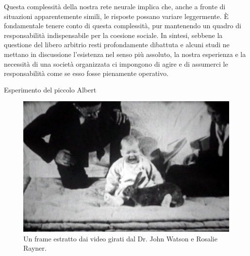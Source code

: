 \documentclass[12pt]{book} %
\begin{document}
Questa complessità della nostra rete neurale implica che, anche a fronte di situazioni apparentemente simili, le risposte possano variare leggermente. È fondamentale tenere conto di questa complessità, pur mantenendo un quadro di responsabilità indispensabile per la coesione sociale. In sintesi, sebbene la questione del libero arbitrio resti profondamente dibattuta e alcuni studi ne mettano in discussione l'esistenza nel senso più assoluto, la nostra esperienza e la necessità di una società organizzata ci impongono di agire e di assumerci le responsabilità come se esso fosse pienamente operativo.

\needspace{4cm}
\begin{mdframed}[linewidth=1pt]
Esperimento del piccolo Albert

\begin{figure}
  \centering
  \includegraphics[width=0.95\linewidth]{images/Libro-img002.jpg}
  \begin{minipage}{\linewidth}
    \caption{Un frame estratto dai video girati dal Dr. John Watson e Rosalie Rayner.}
  \end{minipage}
\end{figure}


\end{mdframed}
\end{document}
